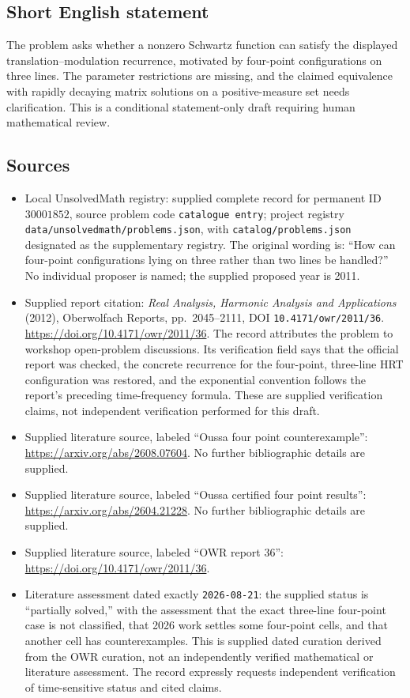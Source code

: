 \documentclass[11pt]{article}
\begin{document}
\subsection{Short English statement}
The problem asks whether a nonzero Schwartz function can satisfy the displayed translation--modulation recurrence, motivated by four-point configurations on three lines. The parameter restrictions are missing, and the claimed equivalence with rapidly decaying matrix solutions on a positive-measure set needs clarification. This is a conditional statement-only draft requiring human mathematical review.
\subsection{Sources}
\begin{itemize}
\item Local UnsolvedMath registry: supplied complete record for permanent ID \(30001852\), source problem code \texttt{catalogue entry}; project registry \texttt{data/unsolvedmath/problems.json}, with \texttt{catalog/problems.json} designated as the supplementary registry. The original wording is: ``How can four-point configurations lying on three rather than two lines be handled?'' No individual proposer is named; the supplied proposed year is 2011.
\item Supplied report citation: \emph{Real Analysis, Harmonic Analysis and Applications} (2012), Oberwolfach Reports, pp.\ 2045--2111, DOI \texttt{10.4171/owr/2011/36}. \url{https://doi.org/10.4171/owr/2011/36}. The record attributes the problem to workshop open-problem discussions. Its verification field says that the official report was checked, the concrete recurrence for the four-point, three-line HRT configuration was restored, and the exponential convention follows the report's preceding time-frequency formula. These are supplied verification claims, not independent verification performed for this draft.
\item Supplied literature source, labeled ``Oussa four point counterexample'': \url{https://arxiv.org/abs/2608.07604}. No further bibliographic details are supplied.
\item Supplied literature source, labeled ``Oussa certified four point results'': \url{https://arxiv.org/abs/2604.21228}. No further bibliographic details are supplied.
\item Supplied literature source, labeled ``OWR report 36'': \url{https://doi.org/10.4171/owr/2011/36}.
\item Literature assessment dated exactly \texttt{2026-08-21}: the supplied status is ``partially solved,'' with the assessment that the exact three-line four-point case is not classified, that 2026 work settles some four-point cells, and that another cell has counterexamples. This is supplied dated curation derived from the OWR curation, not an independently verified mathematical or literature assessment. The record expressly requests independent verification of time-sensitive status and cited claims.
\end{itemize}
\end{document}
